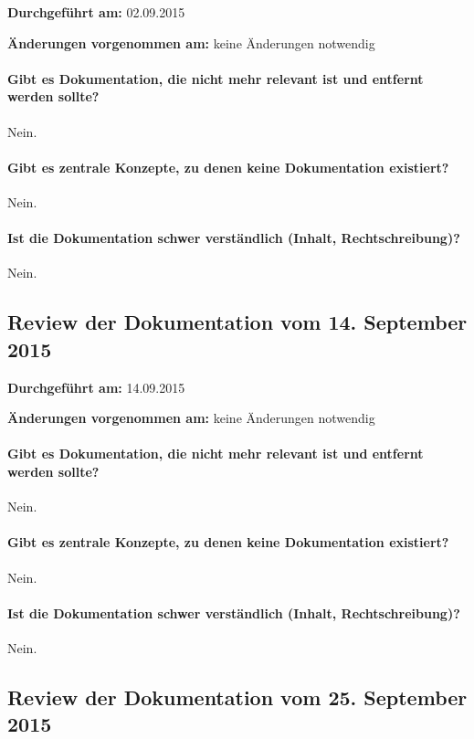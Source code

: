 \textbf{Durchgeführt am:} 02.09.2015

\textbf{Änderungen vorgenommen am:} keine Änderungen notwendig

\paragraph{Gibt es Dokumentation, die nicht mehr relevant ist und entfernt werden sollte?}
Nein.

\paragraph{Gibt es zentrale Konzepte, zu denen keine Dokumentation existiert?}
Nein.

\paragraph{Ist die Dokumentation schwer verständlich (Inhalt, Rechtschreibung)?}
Nein.


\subsection{Review der Dokumentation vom 14. September 2015}

\textbf{Durchgeführt am:} 14.09.2015

\textbf{Änderungen vorgenommen am:} keine Änderungen notwendig

\paragraph{Gibt es Dokumentation, die nicht mehr relevant ist und entfernt werden sollte?}
Nein.

\paragraph{Gibt es zentrale Konzepte, zu denen keine Dokumentation existiert?}
Nein.

\paragraph{Ist die Dokumentation schwer verständlich (Inhalt, Rechtschreibung)?}
Nein.


\subsection{Review der Dokumentation vom 25. September 2015}

